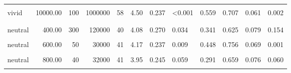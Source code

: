 \documentclass[
]{article}
\begin{document}
\begin{longtable}[t]{lrrrrrrlrrrl}
\hspace{1em}\cellcolor{gray!10}{vivid} & \cellcolor{gray!10}{10000.00} & \cellcolor{gray!10}{30} & \cellcolor{gray!10}{300000} & \cellcolor{gray!10}{58} & \cellcolor{gray!10}{4.40} & \cellcolor{gray!10}{0.223} & \cellcolor{gray!10}{<0.001} & \cellcolor{gray!10}{0.532} & \cellcolor{gray!10}{0.690} & \cellcolor{gray!10}{0.062} & \cellcolor{gray!10}{0.005}\\
\hspace{1em}vivid & 10000.00 & 100 & 1000000 & 58 & 4.50 & 0.237 & <0.001 & 0.559 & 0.707 & 0.061 & 0.002\\
\addlinespace[0.3em]
\multicolumn{12}{l}{\textbf{Exp. AS (filtered)}}\\
\hspace{1em}\cellcolor{gray!10}{neutral} & \cellcolor{gray!10}{400.00} & \cellcolor{gray!10}{20} & \cellcolor{gray!10}{8000} & \cellcolor{gray!10}{41} & \cellcolor{gray!10}{4.17} & \cellcolor{gray!10}{0.221} & \cellcolor{gray!10}{0.005} & \cellcolor{gray!10}{0.481} & \cellcolor{gray!10}{0.732} & \cellcolor{gray!10}{0.071} & \cellcolor{gray!10}{0.004}\\
\hspace{1em}neutral & 400.00 & 300 & 120000 & 40 & 4.08 & 0.270 & 0.034 & 0.341 & 0.625 & 0.079 & 0.154\\
\hspace{1em}\cellcolor{gray!10}{neutral} & \cellcolor{gray!10}{600.00} & \cellcolor{gray!10}{20} & \cellcolor{gray!10}{12000} & \cellcolor{gray!10}{40} & \cellcolor{gray!10}{4.08} & \cellcolor{gray!10}{0.244} & \cellcolor{gray!10}{0.019} & \cellcolor{gray!10}{0.377} & \cellcolor{gray!10}{0.700} & \cellcolor{gray!10}{0.074} & \cellcolor{gray!10}{0.017}\\
\hspace{1em}neutral & 600.00 & 50 & 30000 & 41 & 4.17 & 0.237 & 0.009 & 0.448 & 0.756 & 0.069 & 0.001\\
\hspace{1em}\cellcolor{gray!10}{neutral} & \cellcolor{gray!10}{800.00} & \cellcolor{gray!10}{10} & \cellcolor{gray!10}{8000} & \cellcolor{gray!10}{40} & \cellcolor{gray!10}{4.33} & \cellcolor{gray!10}{0.210} & \cellcolor{gray!10}{<0.001} & \cellcolor{gray!10}{0.630} & \cellcolor{gray!10}{0.725} & \cellcolor{gray!10}{0.072} & \cellcolor{gray!10}{0.006}\\
\hspace{1em}neutral & 800.00 & 40 & 32000 & 41 & 3.95 & 0.245 & 0.059 & 0.291 & 0.659 & 0.076 & 0.060\\
\hspace{1em}\cellcolor{gray!10}{neutral} & \cellcolor{gray!10}{1000.00} & \cellcolor{gray!10}{20} & \cellcolor{gray!10}{20000} & \cellcolor{gray!10}{40} & \cellcolor{gray!10}{4.40} & \cellcolor{gray!10}{0.223} & \cellcolor{gray!10}{<0.001} & \cellcolor{gray!10}{0.646} & \cellcolor{gray!10}{0.750} & \cellcolor{gray!10}{0.070} & \cellcolor{gray!10}{0.002}\\

\end{longtable}
\end{document}

